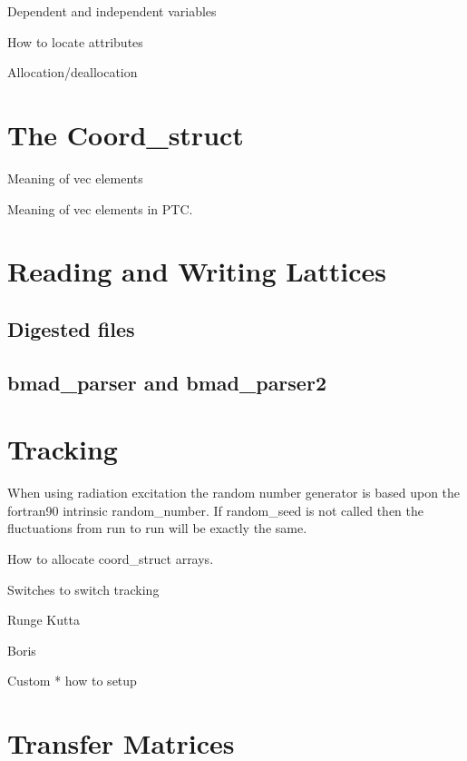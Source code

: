 \documentclass{book}
\begin{document}
  Dependent and independent variables

  How to locate attributes

  Allocation/deallocation

\chapter{The Coord\_struct}

  Meaning of vec elements

  Meaning of vec elements in PTC.

\chapter{Reading and Writing Lattices}

\section{Digested files}

\section{bmad\_parser and bmad\_parser2}

\chapter{Tracking}

When using radiation excitation the random number generator is based
upon the fortran90 intrinsic random\_number. If random\_seed is not called
then the fluctuations from run to run will be exactly the same.


How to allocate coord\_struct arrays. 

  Switches to switch tracking

  Runge Kutta

  Boris

  Custom
    * how to setup



\chapter{Transfer Matrices}
\end{document}
